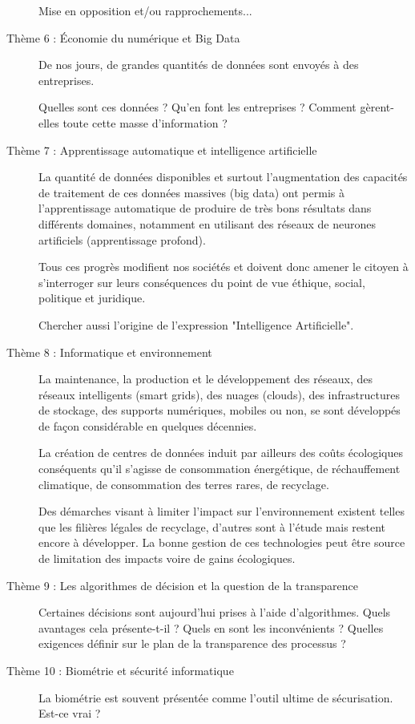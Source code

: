 \begin{description}
	Mise en opposition et/ou rapprochements...


	\item[Thème 6 : Économie du numérique et Big Data]
	De nos jours, de grandes quantités de données sont envoyés à des entreprises.

	Quelles sont ces données ? Qu'en font les entreprises ? Comment gèrent-elles toute cette masse d'information ?


	\item[Thème 7 : Apprentissage automatique et intelligence artificielle]
	La quantité de données disponibles et surtout l'augmentation des capacités de traitement de ces données massives (big data) ont permis à l'apprentissage automatique de produire de très bons résultats dans différents domaines, notamment en utilisant des réseaux de neurones artificiels (apprentissage profond).
	
	Tous ces progrès modifient nos sociétés et doivent donc amener le citoyen à s'interroger sur leurs conséquences du point de vue éthique, social, politique et juridique.
	
	Chercher aussi l'origine de l'expression "Intelligence Artificielle".
	
	
	\item[Thème 8 : Informatique et environnement]
	La maintenance, la production et le développement des réseaux, des réseaux intelligents (smart grids), des nuages (clouds), des infrastructures de stockage, des supports numériques, mobiles ou non, se sont développés de façon considérable en quelques décennies.
	
	La création de centres de données induit par ailleurs des coûts écologiques conséquents qu'il s'agisse de consommation énergétique, de réchauffement climatique, de consommation des terres rares, de recyclage.
	
	Des démarches visant à limiter l'impact sur l'environnement existent telles que les filières légales de recyclage, d'autres sont à l'étude mais restent encore à développer. La bonne gestion de ces technologies peut être source de limitation des impacts voire de gains écologiques.
	
	
	\item[Thème 9 : Les algorithmes de décision et la question de la transparence]
	Certaines décisions sont aujourd'hui prises à l'aide d'algorithmes. Quels avantages cela présente-t-il ? Quels en sont les inconvénients ? Quelles exigences définir sur le plan de la transparence des processus ?
	
	
	\item[Thème 10 : Biométrie et sécurité informatique]
	La biométrie est souvent présentée comme l'outil ultime de sécurisation. Est-ce vrai ?
	

\end{description}
